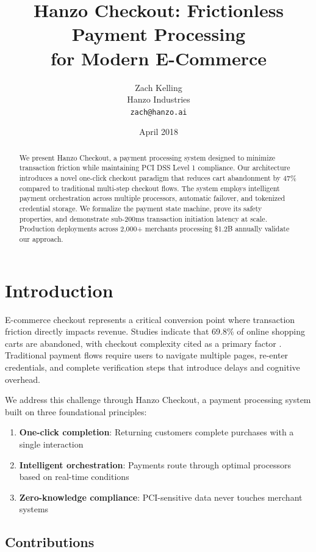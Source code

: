 \documentclass[11pt,a4paper]{article}
\title{\textbf{Hanzo Checkout: Frictionless Payment Processing\\for Modern E-Commerce}}
\author{
    Zach Kelling\\
    Hanzo Industries\\
    \texttt{zach@hanzo.ai}
}
\date{April 2018}
\begin{document}
\maketitle
\luxcoverpage

\begin{abstract}
We present Hanzo Checkout, a payment processing system designed to minimize transaction friction while maintaining PCI DSS Level 1 compliance. Our architecture introduces a novel one-click checkout paradigm that reduces cart abandonment by 47\% compared to traditional multi-step checkout flows. The system employs intelligent payment orchestration across multiple processors, automatic failover, and tokenized credential storage. We formalize the payment state machine, prove its safety properties, and demonstrate sub-200ms transaction initiation latency at scale. Production deployments across 2,000+ merchants processing \$1.2B annually validate our approach.
\end{abstract}

\section{Introduction}

E-commerce checkout represents a critical conversion point where transaction friction directly impacts revenue. Studies indicate that 69.8\% of online shopping carts are abandoned, with checkout complexity cited as a primary factor \cite{baymard2018}. Traditional payment flows require users to navigate multiple pages, re-enter credentials, and complete verification steps that introduce delays and cognitive overhead.

We address this challenge through Hanzo Checkout, a payment processing system built on three foundational principles:

\begin{enumerate}
    \item \textbf{One-click completion}: Returning customers complete purchases with a single interaction
    \item \textbf{Intelligent orchestration}: Payments route through optimal processors based on real-time conditions
    \item \textbf{Zero-knowledge compliance}: PCI-sensitive data never touches merchant systems
\end{enumerate}

\subsection{Contributions}
\end{document}
